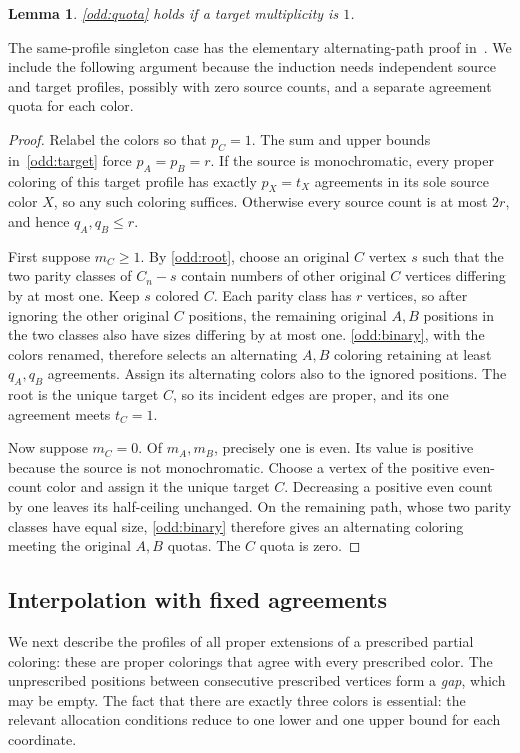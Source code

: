 \documentclass[10pt,a4paper]{amsart}
\numberwithin{equation}{section}
\newtheorem{lemma}[theorem]{Lemma}
\theoremstyle{definition}
\theoremstyle{remark}
\begin{document}
\begin{lemma}\label{odd:singleton}
\cref{odd:quota} holds if a target multiplicity is $1$.
\end{lemma}
The same-profile singleton case has the elementary alternating-path
proof in~\cite[Theorem~7]{raleigh2018}. We include the following argument
because the induction needs independent source and target profiles,
possibly with zero source counts, and a separate agreement quota for
each color.
\begin{proof}
Relabel the colors so that $p_C=1$. The sum and upper bounds
in~\eqref{odd:target} force $p_A=p_B=r$. If the source is
monochromatic, every proper coloring of this target profile has
exactly $p_X=t_X$ agreements in its sole source color $X$, so any
such coloring suffices. Otherwise every source count is at most
$2r$, and hence $q_A,q_B\le r$.

First suppose $m_C\ge1$. By \cref{odd:root}, choose an original
$C$ vertex $s$ such that the two parity classes of $C_n-s$ contain
numbers of other original $C$ vertices differing by at most one.
Keep $s$ colored $C$. Each parity class has $r$ vertices, so after
ignoring the other original $C$ positions, the remaining original
$A,B$ positions in the two classes also have sizes differing by at
most one. \cref{odd:binary}, with the colors renamed, therefore
selects an alternating $A,B$ coloring retaining at least $q_A,q_B$
agreements. Assign its alternating colors also to the ignored
positions. The root is the unique target $C$, so its incident edges
are proper, and its one agreement meets $t_C=1$.

Now suppose $m_C=0$. Of $m_A,m_B$, precisely one is even. Its value
is positive because the source is not monochromatic.
Choose a vertex of the positive even-count
color and assign it the unique target $C$. Decreasing a positive even
count by one leaves its half-ceiling unchanged. On the remaining path,
whose two parity classes have equal size, \cref{odd:binary} therefore
gives an alternating coloring
meeting the original $A,B$ quotas. The $C$ quota is zero.
\end{proof}

\subsection{Interpolation with fixed agreements}

We next describe the profiles of all proper extensions of a prescribed
partial coloring: these are proper colorings that agree with every
prescribed color. The unprescribed positions between consecutive
prescribed vertices form a \emph{gap}, which may be empty.
The fact that there are exactly three colors is
essential: the relevant allocation conditions reduce to one lower and
one upper bound for each coordinate.
\end{document}
